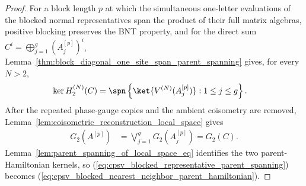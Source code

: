\begin{proof}
    \leanok
    For a block length $p$ at which the simultaneous one-letter evaluations of
    the blocked normal representatives span the product of their full matrix
    algebras, positive blocking preserves the BNT property, and for the direct
    sum $C^i=\bigoplus_{j=1}^{g}(A_j^{[p]})^i$,
    Lemma~\ref{thm:block_diagonal_one_site_span_parent_spanning} gives, for
    every $N>2$,
    \begin{align}
        \ker H_2^{(N)}(C)
         & =\spn\left\{\ket{V^{(N)}(A_j^{[p]})}:1\leq j\leq g\right\}.
        \label{eq:cpsv_blocked_representative_parent_spanning}
    \end{align}
    After the repeated phase-gauge copies and the ambient coisometry are
    removed, Lemma~\ref{lem:coisometric_reconstruction_local_space} gives
    \begin{align}
        G_2(A^{[p]})
         & =\bigvee_{j=1}^{g}G_2(A_j^{[p]})=G_2(C).
        \label{eq:cpsv_actual_direct_sum_local_space}
    \end{align}
    Lemma~\ref{lem:parent_spanning_of_local_space_eq} identifies the two
    parent-Hamiltonian kernels, so
    (\ref{eq:cpsv_blocked_representative_parent_spanning}) becomes
    (\ref{eq:cpsv_blocked_nearest_neighbor_parent_hamiltonian}).
\end{proof}

